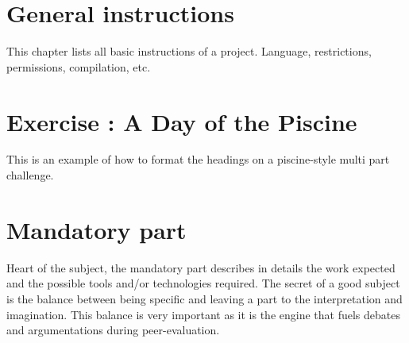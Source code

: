 \documentclass{42-en}
\begin{document}
\chapter{General instructions}

    This chapter lists all basic instructions of a project.
    Language, restrictions, permissions, compilation, etc.


\startexercices


\chapter{Exercise \exercicenumber: A Day of the Piscine}

\exnumber{\exercicenumber}

\makeheaderfiles

    This is an example of how to format the headings on a piscine-style multi part
    challenge.

\nextexercice

\chapter{Mandatory part}

    Heart of the subject, the mandatory part describes in details the
    work expected and the possible tools and/or technologies
    required. The secret of a good subject is the balance between
    being specific and leaving a part to the interpretation and
    imagination. This balance is very important as it is the engine
    that fuels debates and argumentations during peer-evaluation.
\end{document}
